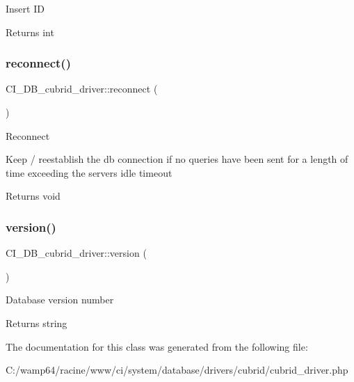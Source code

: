 Insert ID

\begin{DoxyReturn}{Returns}
int 
\end{DoxyReturn}
\mbox{\label{class_c_i___d_b__cubrid__driver_a6de75d925af9ab22ef31ef7ea662f501}} 
\subsubsection{\texorpdfstring{reconnect()}{reconnect()}}
{\footnotesize\ttfamily C\+I\+\_\+\+D\+B\+\_\+cubrid\+\_\+driver\+::reconnect (\begin{DoxyParamCaption}{ }\end{DoxyParamCaption})}

Reconnect

Keep / reestablish the db connection if no queries have been sent for a length of time exceeding the server\textquotesingle{}s idle timeout

\begin{DoxyReturn}{Returns}
void 
\end{DoxyReturn}
\mbox{\label{class_c_i___d_b__cubrid__driver_a884a0f0526d265ee6cad5051dfaf8e8f}} 
\subsubsection{\texorpdfstring{version()}{version()}}
{\footnotesize\ttfamily C\+I\+\_\+\+D\+B\+\_\+cubrid\+\_\+driver\+::version (\begin{DoxyParamCaption}{ }\end{DoxyParamCaption})}

Database version number

\begin{DoxyReturn}{Returns}
string 
\end{DoxyReturn}


The documentation for this class was generated from the following file\+:\begin{DoxyCompactItemize}
\item 
C\+:/wamp64/racine/www/ci/system/database/drivers/cubrid/cubrid\+\_\+driver.\+php\end{DoxyCompactItemize}

